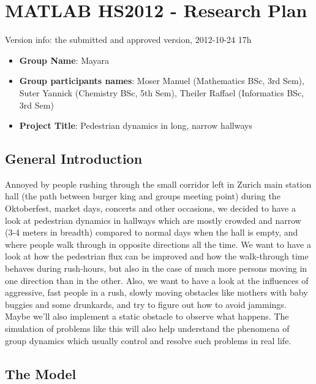 
\section*{MATLAB HS2012 - Research Plan}

Version info: the submitted and approved version, 2012-10-24 17h\\

\begin{itemize}
 \item \textbf{Group Name}: Mayara
 \item \textbf{Group participants names}: Moser Manuel (Mathematics BSc, 3rd Sem), Suter Yannick (Chemistry BSc, 5th Sem), Theiler Raffael (Informatics BSc, 3rd Sem)
 \item \textbf{Project Title}: Pedestrian dynamics in long, narrow hallways
\end{itemize} 

\subsection*{General Introduction}

Annoyed by people rushing through the small corridor left in Zurich main station hall (the path between burger king and groups meeting point) during the Oktoberfest, market days, concerts and other occasions, we decided to have a look at pedestrian dynamics in hallways which are mostly crowded and narrow (3-4 meters in breadth) compared to normal days when the hall is empty, and where people walk through in opposite directions all the time. We want to have a look at how the pedestrian flux can be improved and how the walk-through time behaves during rush-hours, but also in the case of much more persons moving in one direction than in the other. Also, we want to have a look at the influences of aggressive, fast people in a rush, slowly moving obstacles like mothers with baby buggies and some drunkards, and try to figure out how to avoid jammings. Maybe we'll also implement a static obstacle to observe what happens. The simulation of problems like this will also help understand the phenomena of group dynamics which usually control and resolve such problems in real life.

\subsection*{The Model}


